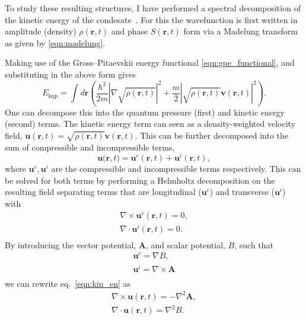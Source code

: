 \iffalse
To study these resulting structures, I have performed a spectral decomposition of the kinetic energy of the condesate~\cite{CT:Nore_prl_1997,CT:Nore_pof_1997,CT:Bradley_prx_2012}. For this the wavefunction is first written in amplitude (density) $\rho(\mathbf{r},t)$ and phase $S(\mathbf{r},t)$ form via a Madelung transform as given by \ref{eqn:madelung}.
\iffalse
as
$
		\Psi(\mathbf{r},t) = \sqrt{\rho(\mathbf{r},t)}\exp{\left[\mathrm{i}S(\mathbf{r},t)\right]}.
$
\fi
Making use of the Gross--Pitaevskii energy functional \ref{eqn:gpe_functional}, and substituting in the above form gives
\begin{equation}
    E_{\text{kqp}} = \int d\mathbf{r} \left( \frac{\hbar^2}{2m}| \nabla\sqrt{\rho(\mathbf{r},t)} |^2  + \frac{m}{2}|\sqrt{\rho(\mathbf{r},t)}\mathbf{v}(\mathbf{r},t) |^2\right).
\end{equation}
One can decompose this into the quantum pressure (first) and kinetic energy (second) terms. The kinetic energy term can seen as a density-weighted velocity field, $\mathbf{u}(\mathbf{r},t) = \sqrt{\rho(\mathbf{r},t)}\mathbf{v}(\mathbf{r},t)$. This can be further decomposed into the sum of compressible and incompressible terms,
\begin{equation}\label{eqn:kin_en}
    \mathbf{u(r},t) = \mathbf{u}^c(\mathbf{r},t) + \mathbf{u}^i(\mathbf{r},t),
\end{equation}
where $\mathbf{u}^c, \mathbf{u}^i$ are the compressible and incompressible terms respectively. This can be solved for both terms by performing a Helmholtz decomposition on the resulting field separating terms that are longitudinal ($\mathbf{u}^c$) and transverse ($\mathbf{u}^i$) with
\begin{subequations}\label{eqn:kinterms}
\begin{align}
    \nabla \times \mathbf{u}^c(\mathbf{r},t) = 0, \\
    \nabla \cdot \mathbf{u}^i(\mathbf{r},t) = 0.\\
\end{align}
\end{subequations}
By introducing the vector potential, $\mathbf{A}$, and scalar potential, $B$, such that
\begin{subequations}
\begin{align}
    \mathbf{u}^c = \nabla B, \\
    \mathbf{u}^i = \nabla \times \mathbf{A} \\
\end{align}
\end{subequations}
we can rewrite eq.~\ref{eqn:kin_en} as
\begin{align}
    \nabla \times \mathbf{u}(\mathbf{r},t) = -\nabla^2 \mathbf{A}, \\
    \nabla \cdot \mathbf{u}(\mathbf{r},t) = \nabla^2 {B}. \\
\end{align}

